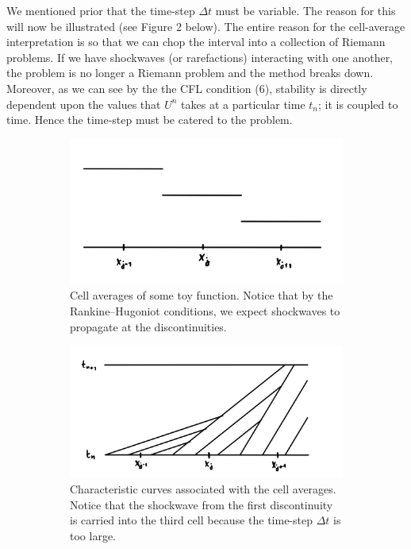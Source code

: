 \documentclass{myproject}
\begin{document}
We mentioned prior that the time-step $\Delta t$ must be variable. The reason for this will now be illustrated (see Figure 2 below). The entire reason for the cell-average interpretation is so that we can chop the interval into a collection of Riemann problems. If we have shockwaves (or rarefactions) interacting with one another, the problem is no longer a Riemann problem and the method breaks down. Moreover, as we can see by the the CFL condition (6), stability is directly dependent upon the values that $U^n$ takes at a particular time $t_n$; it is coupled to time. Hence the time-step must be catered to the problem.
\begin{figure}[h]
    \centering
    \begin{subfigure}[b]{0.49\textwidth}
        \centering
        \includegraphics[width=\textwidth]{steps_for_shocks_crossing_cells.png}
        \caption{Cell averages of some toy function. Notice that by the Rankine–Hugoniot conditions, we expect shockwaves to propagate at the discontinuities.}
    \end{subfigure}\hfill
    \begin{subfigure}{0.49\textwidth}
        \centering
        \includegraphics[width=\textwidth]{shockwaves_crossing_multiple_cells.png}
        \caption{Characteristic curves associated with the cell averages. Notice that the shockwave from the first discontinuity is carried into the third cell because the time-step $\Delta t$ is too large.}
    \end{subfigure}
    \caption{}
\end{figure}
\end{document}
